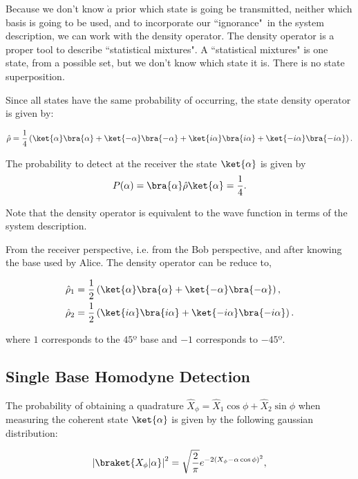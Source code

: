 Because we don't know $\grave{a}$ prior which state is going be transmitted, neither which basis is going to be used, and to incorporate our ``ignorance"\, in the system description, we can work with the density operator. The density operator is a proper tool to describe ``statistical mixtures". A ``statistical mixtures" is one state, from a possible set, but we don't know which state it is. There is no state superposition.

Since all states have the same probability of occurring, the state density operator is given by:

\begin{equation}\label{eq:statedensity}
\hat{\rho}=\frac{1}{4}\left(\ket{\alpha}\bra{\alpha}+\ket{-\alpha}\bra{-\alpha}+\ket{i\alpha}\bra{i\alpha}+\ket{-i\alpha}\bra{-i\alpha}\right).
\end{equation}

The probability to detect at the receiver the state $\ket{\alpha}$ is given by
\begin{equation}\label{eq:statedensity}
P(\alpha)=\bra{\alpha}\hat{\rho}\ket{\alpha}=\frac{1}{4}.
\end{equation}


Note that the density operator is equivalent to the wave function in terms of the system description.

From the receiver perspective, i.e. from the Bob perspective, and after knowing the base used by Alice.
The density operator can be reduce to,

\begin{align}
\hat{\rho}_1&=\frac{1}{2}\left(\ket{\alpha}\bra{\alpha}+\ket{-\alpha}\bra{-\alpha}\right),\label{eq:statedensity1} \\
\hat{\rho}_2&=\frac{1}{2}\left(\ket{i\alpha}\bra{i\alpha}+\ket{-i\alpha}\bra{-i\alpha}\right).\label{eq:statedensity2}
\end{align}

where $1$ corresponds to the $45º$ base and $-1$ corresponds to $-45º$.

\subsection{Single Base Homodyne Detection}


The probability of obtaining a quadrature $\hat{X}_\phi=\hat{X}_1\cos\phi+\hat{X}_2\sin\phi$ when measuring the coherent state $\ket{\alpha}$ is given by the following gaussian distribution:

\begin{equation}
\left|\braket{X_\phi|\alpha}\right|^2=\sqrt{\frac{2}{\pi}}e^{-2(X_\phi-\alpha\cos\phi)^2},
\end{equation}

